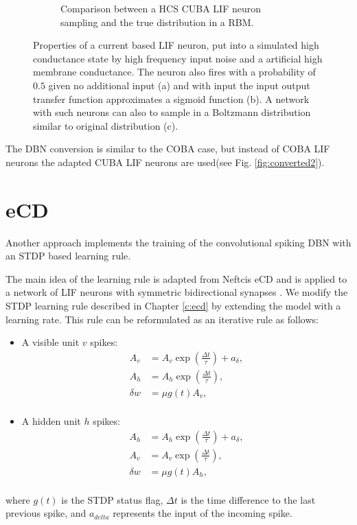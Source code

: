 \begin{figure}
\begin{subfigure}[t]{.5\textwidth}
  		\caption{Comparison between a HCS CUBA LIF neuron sampling and the true distribution in a RBM.}
  		\label{fig:sub2}
	\end{subfigure}
	\caption[Properties of a current based LIF neuron in a high conductance state.]{Properties of a current based LIF neuron, put into a simulated high conductance state by high frequency input noise and a artificial high membrane conductance. The neuron also fires with a probability of $0.5$ given no additional input (a) and with input the input output transfer function approximates a sigmoid function (b). A network with such neurons can also to sample in a Boltzmann distribution similar to original distribution (c).}
	\label{fig:cubahcs}
\end{figure}
The DBN conversion is similar to the COBA case, but instead of COBA LIF neurons the adapted CUBA LIF neurons are used(see Fig. \ref{fig:converted2}).

\section{eCD} \label{c:ecdappr}

Another approach implements the training of the convolutional spiking DBN with an STDP based learning rule. 

The main idea of the learning rule is adapted from Neftcis eCD and is applied to a network of LIF neurons with symmetric bidirectional synapses \cite{Neftci2013}.
We modify the STDP learning rule described in Chapter \ref{c:ecd} by extending the model with a learning rate. 
This rule can be reformulated as an iterative rule as follows:
\begin{itemize}
\item A visible unit $v$ spikes: 
\[
\begin{split}
A_v &= A_v \exp(\frac{\Delta t}{\tau}) + a_{\delta} ,\\
A_h &= A_h \exp(\frac{\Delta t}{\tau}) ,\\
\delta w &= \mu g(t)  A_v  ,\\
\end{split}
\]
\item A hidden unit $h$ spikes: 
\[
\begin{split}
A_h &= A_h \exp(\frac{\Delta t}{\tau}) + a_{\delta} ,\\
A_v &= A_v \exp(\frac{\Delta t}{\tau}) ,\\
\delta w &= \mu  g(t) A_h  ,\\
\end{split}
\]
\end{itemize}
where $g(t)$ is the STDP status flag, $\Delta t$ is the time difference to the last previous spike, and $a_{delta}$ represents the input of the incoming spike.


